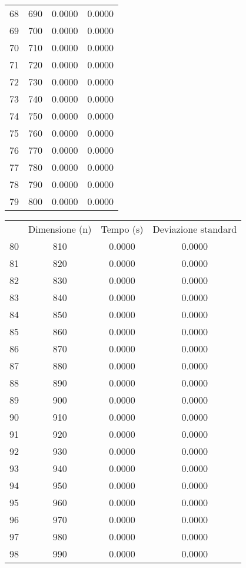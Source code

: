 \begin{table}
\begin{adjustbox}{width=1\textwidth/2}
\begin{tabular}{|c|c|c|c|}
68 & 690 & 0.0000 & 0.0000 \\
\cline{1-4}
69 & 700 & 0.0000 & 0.0000 \\
\cline{1-4}
70 & 710 & 0.0000 & 0.0000 \\
\cline{1-4}
71 & 720 & 0.0000 & 0.0000 \\
\cline{1-4}
72 & 730 & 0.0000 & 0.0000 \\
\cline{1-4}
73 & 740 & 0.0000 & 0.0000 \\
\cline{1-4}
74 & 750 & 0.0000 & 0.0000 \\
\cline{1-4}
75 & 760 & 0.0000 & 0.0000 \\
\cline{1-4}
76 & 770 & 0.0000 & 0.0000 \\
\cline{1-4}
77 & 780 & 0.0000 & 0.0000 \\
\cline{1-4}
78 & 790 & 0.0000 & 0.0000 \\
\cline{1-4}
79 & 800 & 0.0000 & 0.0000 \\
\cline{1-4}
\end{tabular}
\end{adjustbox}
\end{table}

\begin{table}
\centering
\begin{adjustbox}{width=1\textwidth/2}
\begin{tabular}{|c|c|c|c|}
\hline
 & Dimensione (n) & Tempo (s) & Deviazione standard \\
80 & 810 & 0.0000 & 0.0000 \\
\cline{1-4}
81 & 820 & 0.0000 & 0.0000 \\
\cline{1-4}
82 & 830 & 0.0000 & 0.0000 \\
\cline{1-4}
83 & 840 & 0.0000 & 0.0000 \\
\cline{1-4}
84 & 850 & 0.0000 & 0.0000 \\
\cline{1-4}
85 & 860 & 0.0000 & 0.0000 \\
\cline{1-4}
86 & 870 & 0.0000 & 0.0000 \\
\cline{1-4}
87 & 880 & 0.0000 & 0.0000 \\
\cline{1-4}
88 & 890 & 0.0000 & 0.0000 \\
\cline{1-4}
89 & 900 & 0.0000 & 0.0000 \\
\cline{1-4}
90 & 910 & 0.0000 & 0.0000 \\
\cline{1-4}
91 & 920 & 0.0000 & 0.0000 \\
\cline{1-4}
92 & 930 & 0.0000 & 0.0000 \\
\cline{1-4}
93 & 940 & 0.0000 & 0.0000 \\
\cline{1-4}
94 & 950 & 0.0000 & 0.0000 \\
\cline{1-4}
95 & 960 & 0.0000 & 0.0000 \\
\cline{1-4}
96 & 970 & 0.0000 & 0.0000 \\
\cline{1-4}
97 & 980 & 0.0000 & 0.0000 \\
\cline{1-4}
98 & 990 & 0.0000 & 0.0000 \\
\cline{1-4}
\end{tabular}
\end{adjustbox}
\end{table}

